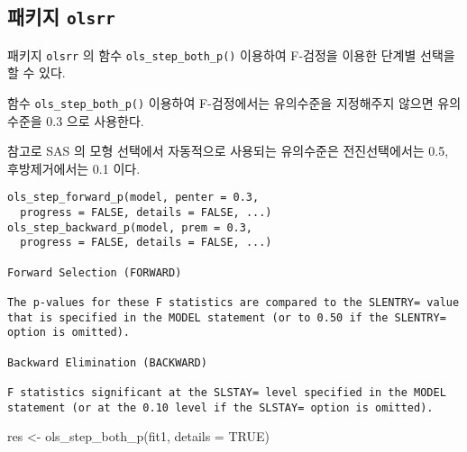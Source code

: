 \documentclass[
]{book}
\makeatletter
\newenvironment{Shaded}{\begin{snugshade}}{\end{snugshade}}
\newcommand{\AttributeTok}[1]{\textcolor[rgb]{0.77,0.63,0.00}{#1}}
\newcommand{\ConstantTok}[1]{\textcolor[rgb]{0.00,0.00,0.00}{#1}}
\newcommand{\FunctionTok}[1]{\textcolor[rgb]{0.00,0.00,0.00}{#1}}
\newcommand{\NormalTok}[1]{#1}
\newcommand{\OtherTok}[1]{\textcolor[rgb]{0.56,0.35,0.01}{#1}}
\newenvironment{kframe}{%
\medskip{}
\setlength{\fboxsep}{.8em}
 \def\at@end@of@kframe{}%
 \ifinner\ifhmode%
  \def\at@end@of@kframe{\end{minipage}}%
  \begin{minipage}{\columnwidth}%
 \fi\fi%
 \def\FrameCommand##1{\hskip\@totalleftmargin \hskip-\fboxsep
 \colorbox{shadecolor}{##1}\hskip-\fboxsep
     \hskip-\linewidth \hskip-\@totalleftmargin \hskip\columnwidth}%
 \MakeFramed {\advance\hsize-\width
   \@totalleftmargin\z@ \linewidth\hsize
   \@setminipage}}%
 {\par\unskip\endMakeFramed%
 \at@end@of@kframe}
\newenvironment{rmdblock}[1]
  {
  \begin{itemize}
  \renewcommand{\labelitemi}{
    \raisebox{-.7\height}[0pt][0pt]{
      {\setkeys{Gin}{width=3em,keepaspectratio}\texttt{[image: images/\#1]}}
    }
  }
  \setlength{\fboxsep}{1em}
  \begin{kframe}
  \item
  }
  {
  \end{kframe}
  \end{itemize}
  }
\newenvironment{rmdcaution}
  {\begin{rmdblock}{caution}}
  {\end{rmdblock}}
\makeatother
\begin{document}
\hypertarget{uxd328uxd0a4uxc9c0-olsrr}{%
\subsection{\texorpdfstring{패키지 \texttt{olsrr}}{패키지 olsrr}}\label{uxd328uxd0a4uxc9c0-olsrr}}

패키지 \texttt{olsrr} 의 함수 \texttt{ols\_step\_both\_p()} 이용하여 F-검정을 이용한 단계별 선택을 할 수 있다.

\begin{rmdcaution}
함수 \texttt{ols\_step\_both\_p()} 이용하여 F-검정에서는 유의수준을 지정해주지 않으면
유의 수준을 0.3 으로 사용한다.

참고로 SAS 의 모형 선택에서 자동적으로 사용되는 유의수준은 전진선택에서는 0.5, 후방제거에서는 0.1 이다.\\
\end{rmdcaution}

\begin{verbatim}
ols_step_forward_p(model, penter = 0.3,
  progress = FALSE, details = FALSE, ...)
ols_step_backward_p(model, prem = 0.3,
  progress = FALSE, details = FALSE, ...)

Forward Selection (FORWARD)

The p-values for these F statistics are compared to the SLENTRY= value that is specified in the MODEL statement (or to 0.50 if the SLENTRY= option is omitted). 

Backward Elimination (BACKWARD)

F statistics significant at the SLSTAY= level specified in the MODEL statement (or at the 0.10 level if the SLSTAY= option is omitted). 
\end{verbatim}

\begin{Shaded}
\begin{Highlighting}[]
\NormalTok{res }\OtherTok{\textless{}{-}} \FunctionTok{ols\_step\_both\_p}\NormalTok{(fit1, }\AttributeTok{details =} \ConstantTok{TRUE}\NormalTok{)}
\end{Highlighting}
\end{Shaded}
\end{document}
